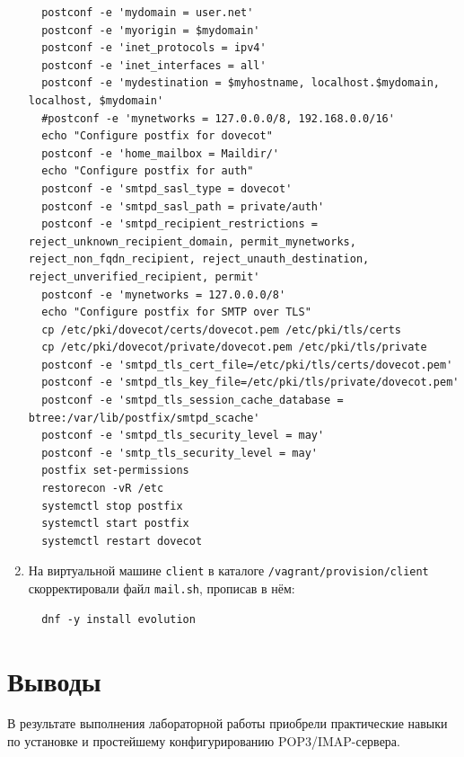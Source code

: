 \begin{enumerate}
\begin{verbatim}
  postconf -e 'mydomain = user.net'
  postconf -e 'myorigin = $mydomain'
  postconf -e 'inet_protocols = ipv4'
  postconf -e 'inet_interfaces = all'
  postconf -e 'mydestination = $myhostname, localhost.$mydomain, localhost, $mydomain'
  #postconf -e 'mynetworks = 127.0.0.0/8, 192.168.0.0/16'
  echo "Configure postfix for dovecot"
  postconf -e 'home_mailbox = Maildir/'
  echo "Configure postfix for auth"
  postconf -e 'smtpd_sasl_type = dovecot'
  postconf -e 'smtpd_sasl_path = private/auth'
  postconf -e 'smtpd_recipient_restrictions = reject_unknown_recipient_domain, permit_mynetworks, reject_non_fqdn_recipient, reject_unauth_destination, reject_unverified_recipient, permit'
  postconf -e 'mynetworks = 127.0.0.0/8'
  echo "Configure postfix for SMTP over TLS"
  cp /etc/pki/dovecot/certs/dovecot.pem /etc/pki/tls/certs
  cp /etc/pki/dovecot/private/dovecot.pem /etc/pki/tls/private
  postconf -e 'smtpd_tls_cert_file=/etc/pki/tls/certs/dovecot.pem'
  postconf -e 'smtpd_tls_key_file=/etc/pki/tls/private/dovecot.pem'
  postconf -e 'smtpd_tls_session_cache_database = btree:/var/lib/postfix/smtpd_scache'
  postconf -e 'smtpd_tls_security_level = may'
  postconf -e 'smtp_tls_security_level = may'
  postfix set-permissions
  restorecon -vR /etc
  systemctl stop postfix
  systemctl start postfix
  systemctl restart dovecot
\end{verbatim}
\item На виртуальной машине \texttt{client} в каталоге \texttt{/vagrant/provision/client} скорректировали файл \texttt{mail.sh}, прописав в нём:
\begin{verbatim}
  dnf -y install evolution
\end{verbatim}
\end{enumerate}

\section{Выводы}
В результате выполнения лабораторной работы приобрели практические навыки по установке и простейшему конфигурированию POP3/IMAP-сервера.

